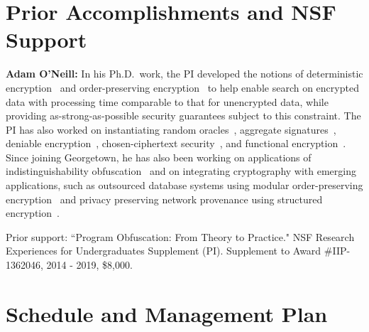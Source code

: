 \documentclass[11pt]{article}
\theoremstyle{remark}
\begin{document}
\section{Prior Accomplishments and NSF Support}

\textbf{Adam O'Neill:}
In his Ph.D.~work, the PI  developed the notions of deterministic encryption~\cite{C:BelBolOne07,ABO07,C:BolFehOne08,C:BFOR08,TCC:FulNeiRey12} and order-preserving encryption~\cite{EC:BCLO09,C:BolCheOne11} to help enable search on encrypted data with processing time comparable to that for unencrypted data, while providing as-strong-as-possible security guarantees subject to this constraint.
The PI has also worked on  instantiating random oracles~\cite{C:KilOneSmi10,TCC:GoyONeRao11,EC:LewONeSmi13},   aggregate signatures~\cite{CCS:BGOY07,AC:GLOW12}, deniable encryption~\cite{C:OnePeiWat11},  chosen-ciphertext security~\cite{EC:KilMohOne10,PKC:DFMO14}, and  functional encryption~\cite{EPRINT:ONeill10b,C:DIJOPP13, CANS:BelONe13}.   %
Since joining Georgetown, he has also been working on  applications of indistinguishability obfuscation~\cite{DGLOZ14} and on integrating cryptography with emerging applications, such as outsourced database systems using modular order-preserving encryption~\cite{SIGMOD:MCOKC15} and  privacy preserving network provenance using structured encryption~\cite{LOSZZ14}.

Prior support: ``Program Obfuscation: From Theory to Practice." NSF Research Experiences for Undergraduates Supplement (PI).
Supplement to Award \#IIP-1362046,   2014 - 2019, \$8,000.

\section{Schedule and Management Plan}


{

}
\end{document}
